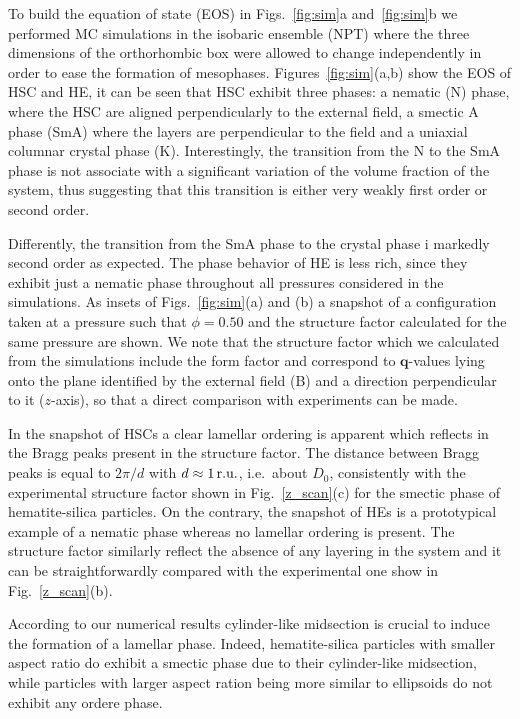 \documentclass[aps,prl,preprint,superscriptaddress]{revtex4-1} %
\begin{document}
To build the equation of state (EOS) in Figs.~\ref{fig:sim}a and~\ref{fig:sim}b we performed MC simulations in the isobaric ensemble (NPT) where the three
dimensions of the orthorhombic box were allowed to change independently in order to ease the formation of mesophases.
Figures~\ref{fig:sim}(a,b) show the EOS of HSC and HE, it can be seen that HSC exhibit three phases: a nematic (N) phase, where the HSC are aligned
perpendicularly to the external field, a smectic A phase (SmA) where the layers are perpendicular to the field and a uniaxial columnar crystal phase (K).
Interestingly, the transition from the N to the SmA phase is not associate with a significant variation of the volume fraction of the system, thus
suggesting that this transition is either very weakly first order or second order. 

Differently, the transition from the SmA phase to the crystal phase
i markedly second order as expected. The phase behavior of HE is less rich, since they exhibit just a nematic phase throughout all pressures considered
in the simulations.
As insets of Figs.~\ref{fig:sim}(a) and (b) a snapshot of a configuration
taken at a pressure such that $\phi=0.50$ and the structure factor 
calculated for the same pressure are shown.  We note that the structure factor which we calculated from the simulations
include the form factor and correspond to $\mathbf{q}$-values lying onto the plane identified by the external field (B) and a direction perpendicular
to it ($z$-axis), so that a direct comparison with experiments can be made.

In the snapshot of HSCs a clear lamellar ordering is apparent which reflects in the Bragg peaks present in the structure factor.
The distance between Bragg peaks is equal to $2\pi/d$ with $d\approx 1\,\hbox{r.u.}$, i.e.~about $D_0$, consistently with the experimental structure
factor shown in Fig.~\ref{z_scan}(c) for the smectic phase of hematite-silica particles.
On the contrary, the snapshot of HEs is a prototypical example of a nematic phase
whereas no lamellar ordering is present. The structure factor similarly reflect the absence of any layering in the system and it can 
be straightforwardly compared with the experimental one show in Fig.~\ref{z_scan}(b).

According to our numerical results cylinder-like midsection is crucial to induce the formation of a lamellar phase. 
Indeed, hematite-silica particles with smaller aspect ratio do exhibit a smectic phase due to their cylinder-like midsection,
while particles with larger aspect ration being more similar to ellipsoids do not exhibit any ordere phase.
\end{document}

